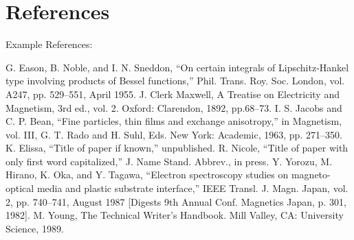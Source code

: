 \documentclass[conference]{IEEEtran}
\begin{document}
\section*{References}
Example References:
\begin{thebibliography}{00}
 G. Eason, B. Noble, and I. N. Sneddon, ``On certain integrals of Lipschitz-Hankel type involving products of Bessel functions,'' Phil. Trans. Roy. Soc. London, vol. A247, pp. 529--551, April 1955.
 J. Clerk Maxwell, A Treatise on Electricity and Magnetism, 3rd ed., vol. 2. Oxford: Clarendon, 1892, pp.68--73.
 I. S. Jacobs and C. P. Bean, ``Fine particles, thin films and exchange anisotropy,'' in Magnetism, vol. III, G. T. Rado and H. Suhl, Eds. New York: Academic, 1963, pp. 271--350.
 K. Elissa, ``Title of paper if known,'' unpublished.
 R. Nicole, ``Title of paper with only first word capitalized,'' J. Name Stand. Abbrev., in press.
 Y. Yorozu, M. Hirano, K. Oka, and Y. Tagawa, ``Electron spectroscopy studies on magneto-optical media and plastic substrate interface,'' IEEE Transl. J. Magn. Japan, vol. 2, pp. 740--741, August 1987 [Digests 9th Annual Conf. Magnetics Japan, p. 301, 1982].
 M. Young, The Technical Writer's Handbook. Mill Valley, CA: University Science, 1989.
\end{thebibliography}
\end{document}
